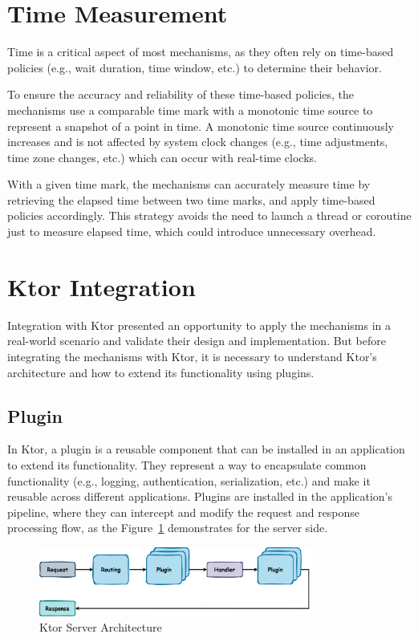\section{Time Measurement}\label{sec:time-measurement}

Time is a critical aspect of most mechanisms, as they often rely on time-based policies (e.g., wait duration, time window, etc.) to determine their behavior.

To ensure the accuracy and reliability of these time-based policies,
the mechanisms use a comparable time mark with a monotonic time source to represent a snapshot of a point in time.
A monotonic time source continuously increases and is not affected by system clock changes (e.g., time adjustments, time zone changes, etc.) which can occur with real-time clocks.

With a given time mark,
the mechanisms can accurately measure time by retrieving the elapsed time between two time marks,
and apply time-based policies accordingly.
This strategy avoids the need to launch a thread or coroutine just to
measure elapsed time, which could introduce unnecessary overhead.


\section{Ktor Integration}\label{sec:ktor-integration}

Integration with Ktor presented an opportunity to apply the mechanisms in a real-world scenario
and validate their design and implementation.
But before integrating the mechanisms with Ktor, it is necessary to understand Ktor's architecture and how to extend its functionality using plugins.

\subsection{Plugin}\label{subsec:plugin}

In Ktor, a plugin is a reusable component that can be installed in an application to extend its functionality.
They represent a way to encapsulate common functionality (e.g., logging, authentication, serialization, etc.) and make it reusable across different applications.
Plugins are installed in the application's pipeline, where they can intercept and modify the request and response processing flow, as the Figure~\ref{fig:ktor-server-architecture} demonstrates for the server side.

\begin{figure}[!htb]
    \centering
    \includegraphics[width=0.8\textwidth]{../figures/03_ktor-server-architecture}
    \caption{Ktor Server Architecture}
    \label{fig:ktor-server-architecture}
\end{figure}

